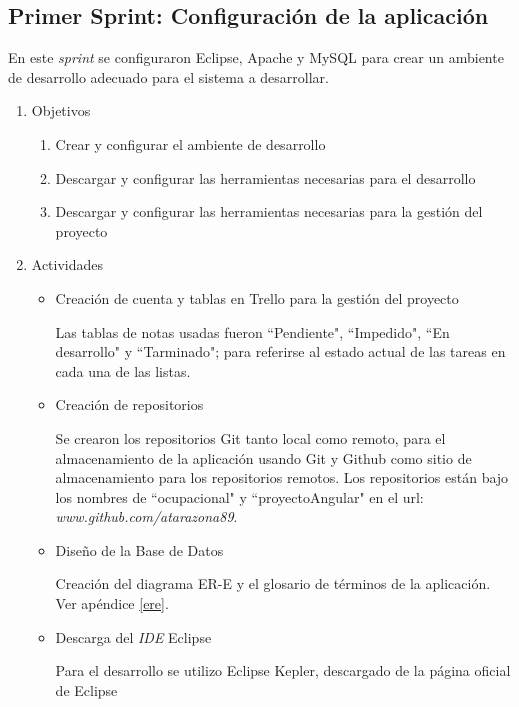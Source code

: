     \subsection{Primer Sprint: Configuración de la aplicación}
    
    En este \textit{sprint} se configuraron Eclipse, Apache y MySQL para crear un ambiente de desarrollo adecuado para el sistema a desarrollar.
    
    \begin{enumerate}
        \item Objetivos
        \begin{enumerate}
            \item Crear y configurar el ambiente de desarrollo
            \item Descargar y configurar las herramientas necesarias para el desarrollo
            \item Descargar y configurar las herramientas necesarias para la gestión del proyecto         
        \end{enumerate}
        \item Actividades
        \begin{itemize}
            \item Creación de cuenta y tablas en Trello para la gestión del proyecto
            
            Las tablas de notas usadas fueron ``Pendiente", ``Impedido", ``En desarrollo" y ``Tarminado"; para referirse al estado actual de las tareas en cada una de las listas.
            
            \item Creación de repositorios
            
            Se crearon los repositorios Git tanto local como remoto, para el almacenamiento de la aplicación usando Git y Github como sitio de almacenamiento para los repositorios remotos. Los repositorios están bajo los nombres de ``ocupacional" y ``proyectoAngular" en el url: \textit{www.github.com/atarazona89}.
            
            \item Diseño de la Base de Datos
            
            Creación del diagrama ER-E y el glosario de términos de la aplicación. Ver apéndice \ref{ere}.
            
            \item Descarga del \textit{IDE} Eclipse
            
            Para el desarrollo se utilizo Eclipse Kepler, descargado de la página oficial de Eclipse\cite{ECLIPSE-eclipseorg}
            

\end{itemize}
\end{enumerate}

